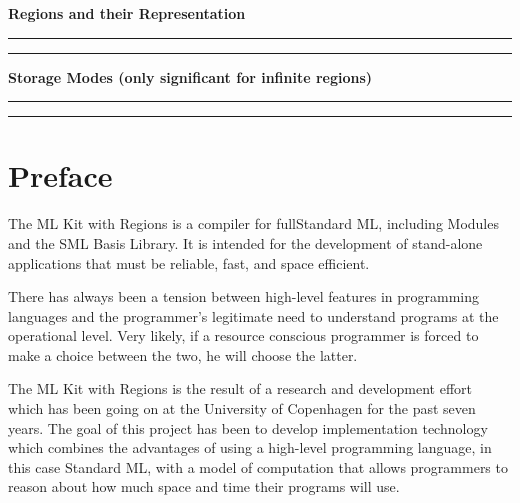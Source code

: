 \documentclass[12pt]{book}
\begin{document}
\begin{center}
\bf Regions and their Representation
\end{center}
\smallskip

\hrule
{}
\hrule
\medskip


\begin{center}
\bf Storage Modes (only significant for infinite regions)
\end{center}
\smallskip

\hrule
{}
\hrule
\medskip
               
\tableofcontents
\chapter*{Preface}
The ML Kit with Regions is a compiler for fullStandard ML,
including Modules and the SML Basis Library. 
It is intended for the development of stand-alone applications that
must be reliable, fast, and space efficient.

There has always been a tension between high-level features in 
programming languages and the programmer's 
legitimate need to understand
programs at the operational level. Very likely, if a resource conscious
programmer is forced to make a choice between the two, he will choose the latter.

The ML Kit with Regions is the result of a research and development
effort which has been going on at the University of Copenhagen for the
past seven years. The goal of this project has been to develop
implementation technology which combines the advantages of using a
high-level programming language, in this case Standard ML, with a model of
computation that allows programmers to reason about how much space
and time their programs will use.
\end{document}
